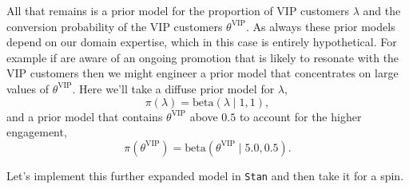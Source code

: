 \documentclass[
  letterpaper,
  DIV=11,
  numbers=noendperiod]{scrartcl}
\begin{document}
All that remains is a prior model for the proportion of VIP customers
\(\lambda\) and the conversion probability of the VIP customers
\(\theta^{\text{VIP}}\). As always these prior models depend on our
domain expertise, which in this case is entirely hypothetical. For
example if are aware of an ongoing promotion that is likely to resonate
with the VIP customers then we might engineer a prior model that
concentrates on large values of \(\theta^{\text{VIP}}\). Here we'll take
a diffuse prior model for \(\lambda\), \[
\pi(\lambda) = \mathrm{beta}(\lambda \mid 1, 1),
\] and a prior model that contains \(\theta^{\text{VIP}}\) above \(0.5\)
to account for the higher engagement, \[
\pi(\theta^{\text{VIP}}) = \mathrm{beta}(\theta^{\text{VIP}} \mid 5.0, 0.5).
\]

Let's implement this further expanded model in \texttt{Stan} and then
take it for a spin.
\end{document}
